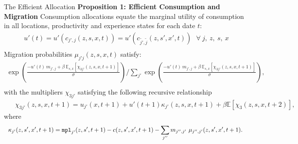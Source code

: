 \documentclass[9pt,pdftex,aspectratio=1610]{beamer}
\theoremstyle{definition}
\begin{document}

\begin{frame}[t]{The Efficient Allocation}
\textbf{Proposition 1: Efficient Consumption and Migration} Consumption allocations equate the marginal utility of consumption in all locations, productivity and experience states for each date $t$:
\vspace{0.15cm}
{\small
\begin{align}
u'(t) = u'(c_{j',j}(z, s, x, t)) = u'(c_{\tilde{j'},\tilde{j}}(z, s', x', t)) \ \ \ \forall \ j, \ z , \ s, \ x  \nonumber \\[.75em] \nonumber
\end{align}
}
Migration probabilities  $\mu_{j'j}(z,s,x,t)$ satisfy:
\vspace{0.25cm}
{\small
\begin{align}
\exp \left(\frac{- u'(t) \ m_{j',j} + \beta \ \mathbb{E}_{s,x}\left[\chi_{3j'}(z,s,x, t+1)\right]}{\sigma} \right)  \Bigg / \sum_{j'} \exp \left( \frac{- u'(t)\ m_{j',j} + \beta \  \mathbb{E}_{s,x}\left[\chi_{3j'}(z,s,x, t+1) \right]}{\sigma} \right), \nonumber \\[.75em] \nonumber
\end{align}
}
with the multipliers $\chi_{3j'}$ satisfying the following recursive relationship
\vspace{0.15cm}
{\small
\begin{align}
& \ \ \chi_{3j'}(z, s, x, t+1) =  u_{j'}(x, t+1) +  u'(t+1) \kappa_{j'}(z, s,x,t+1) + \beta \mathbb{E}\left[\chi_{3}(z,s,x, t+2) \right], \nonumber
\end{align}}
where
\vspace{0.15cm}
{\small
\begin{align}
& \ \ \kappa_{j'}(z, s',x',t+1) = \mbox{\texttt{mpl}}_{j'}(z,s',t+1) - c(z, s',x',t+1) - \sum_{j''}  m_{j'',j'} \ \mu_{j'',j'}(z, s', x', t+1). \nonumber
\end{align}}
\end{frame}

\end{document}
